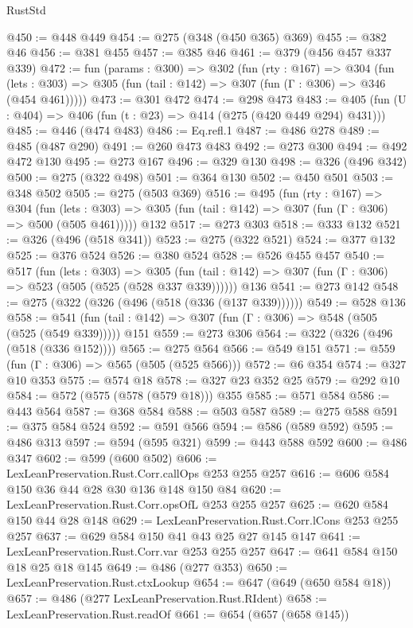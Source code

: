 \begin{lexlean}{RustStd}
\begin{coremodule}
@450 := @448 @449
@454 := @275 (@348 (@450 @365) @369)
@455 := @382 @46
@456 := @381 @455
@457 := @385 @46
@461 := @379 (@456 @457 @337 @339)
@472 := fun (params : @300) =>
  @302
    (fun (rty : @167) =>
    @304
      (fun (lets : @303) => @305 (fun (tail : @142) => @307 (fun (Γ : @306) => @346 (@454 @461)))))
@473 := @301 @472
@474 := @298 @473
@483 := @405 (fun (U : @404) => @406 (fun (t : @23) => @414 (@275 (@420 @449 @294) @431)))
@485 := @446 (@474 @483)
@486 := Eq.refl.{1}
@487 := @486 @278
@489 := @485 (@487 @290)
@491 := @260 @473 @483
@492 := @273 @300
@494 := @492 @472 @130
@495 := @273 @167
@496 := @329 @130
@498 := @326 (@496 @342)
@500 := @275 (@322 @498)
@501 := @364 @130
@502 := @450 @501
@503 := @348 @502
@505 := @275 (@503 @369)
@516 := @495
    (fun (rty : @167) =>
    @304
      (fun (lets : @303) => @305 (fun (tail : @142) => @307 (fun (Γ : @306) => @500 (@505 @461)))))
    @132
@517 := @273 @303
@518 := @333 @132
@521 := @326 (@496 (@518 @341))
@523 := @275 (@322 @521)
@524 := @377 @132
@525 := @376 @524
@526 := @380 @524
@528 := @526 @455 @457
@540 := @517
    (fun (lets : @303) =>
    @305 (fun (tail : @142) => @307 (fun (Γ : @306) => @523 (@505 (@525 (@528 @337 @339))))))
    @136
@541 := @273 @142
@548 := @275 (@322 (@326 (@496 (@518 (@336 (@137 @339))))))
@549 := @528 @136
@558 := @541 (fun (tail : @142) => @307 (fun (Γ : @306) => @548 (@505 (@525 (@549 @339))))) @151
@559 := @273 @306
@564 := @322 (@326 (@496 (@518 (@336 @152))))
@565 := @275 @564
@566 := @549 @151
@571 := @559 (fun (Γ : @306) => @565 (@505 (@525 @566)))
@572 := @6 @354
@574 := @327 @10 @353
@575 := @574 @18
@578 := @327 @23 @352 @25
@579 := @292 @10
@584 := @572 (@575 (@578 (@579 @18))) @355
@585 := @571 @584
@586 := @443 @564
@587 := @368 @584
@588 := @503 @587
@589 := @275 @588
@591 := @375 @584 @524
@592 := @591 @566
@594 := @586 (@589 @592)
@595 := @486 @313
@597 := @594 (@595 @321)
@599 := @443 @588 @592
@600 := @486 @347
@602 := @599 (@600 @502)
@606 := LexLeanPreservation.Rust.Corr.callOps @253 @255 @257
@616 := @606 @584 @150 @36 @44 @28 @30 @136 @148 @150 @84
@620 := LexLeanPreservation.Rust.Corr.opsOfL @253 @255 @257
@625 := @620 @584 @150 @44 @28 @148
@629 := LexLeanPreservation.Rust.Corr.lCons @253 @255 @257
@637 := @629 @584 @150 @41 @43 @25 @27 @145 @147
@641 := LexLeanPreservation.Rust.Corr.var @253 @255 @257
@647 := @641 @584 @150 @18 @25 @18 @145
@649 := @486 (@277 @353)
@650 := LexLeanPreservation.Rust.ctxLookup
@654 := @647 (@649 (@650 @584 @18))
@657 := @486 (@277 LexLeanPreservation.Rust.RIdent)
@658 := LexLeanPreservation.Rust.readOf
@661 := @654 (@657 (@658 @145))

\end{coremodule}
\end{lexlean}
